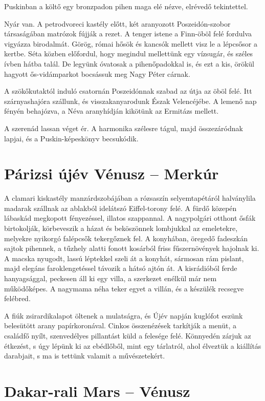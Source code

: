 Puskinban a költő egy bronzpadon pihen maga elé nézve, elrévedő
tekintettel.

Nyár van. A petrodvoreci kastély előtt, két aranyozott Poszeidón-szobor
társaságában matrózok fújják a rezet. A tenger istene a Finn-öböl
felé fordulva vigyázza birodalmát. Görög, római hősök és kancsók
mellett visz le a lépcsősor a kertbe. Séta közben előfordul, hogy
megindul mellettünk egy vízsugár, és széles ívben hátba talál. De
legyünk óvatosak a pihenőpadokkal is, és ezt a kis, örökül hagyott
ős-vidámparkot bocsássuk meg Nagy Péter cárnak.

A szökőkutaktól induló csatornán Poszeidónnak szabad az útja az
öböl felé. Itt szárnyashajóra szállunk, és visszakanyarodunk Észak
Velencéjébe. A lemenő nap fényén behajózva, a Néva aranyhídján
kikötünk az Ermitázs mellett.

A szerenád lassan véget ér. A harmonika szélesre tágul, majd összezáródnak
lapjai, és a Puskin-képeskönyv becsukódik.

\section{Párizsi újév \hfill Vénusz -- Merkúr}

A clamari kiskastély manzárdszobájában a rózsaszín selyemtapétáról
halványlila madarak szállnak az ablakból idelátszó Eiffel-torony felé.
A fürdő közepén lábaskád megkopott fényezéssel, illatos szappannal.
A nagypolgári otthont ősfák birtokolják, körbeveszik a házat és
beköszönnek lombjukkal az emeletekre, melyekre nyikorgó falépcsők
tekergőznek fel. A konyhában, öregedő fadeszkán sajtok pihennek,
a tűzhely alatti fonott kosárból friss fűszernövények hajolnak ki.
A macska nyugodt, lassú léptekkel szeli át a konyhát, sármosan rám
pislant, majd elegáns faroklengetéssel távozik a hátsó ajtón át.
A kisrádióból ferde hanyagsággal, peckesen áll ki egy villa, a szerkezet
enélkül már nem működőképes. A nagymama néha teker egyet a villán, és
a készülék recsegve felébred.

A fiúk zsirardikalapot öltenek a mulatságra, és Újév napján kuglófot
eszünk belesütött arany papírkoronával. Cinkos összenézések tarkítják
a menüt, a családfő nyílt, szenvedélyes pillantást küld a felesége
felé. Könnyedén zárjuk az étkezést, s úgy lépünk ki az ebédlőből, mint
egy tárlatról, ahol élveztük a kiállítás darabjait, s ma is tettünk valamit
a művészetekért.

\section{Dakar-rali \hfill Mars -- Vénusz}

